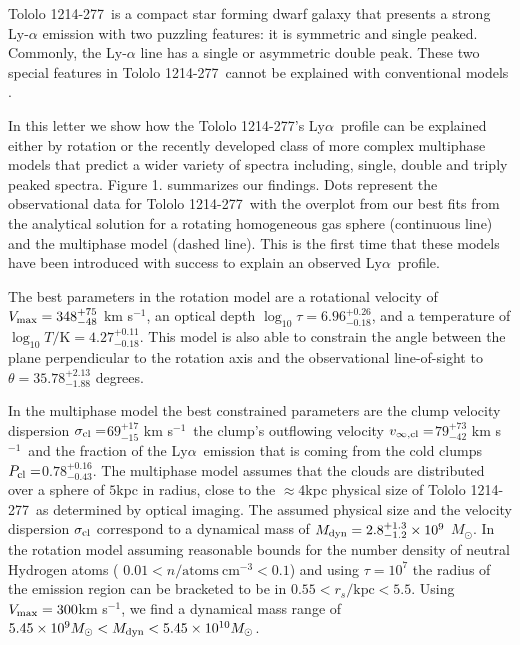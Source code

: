 \documentclass[a4paper, usenatbib, 12pt]{article}
\newcommand{\tol}{Tololo 1214-277}
\newcommand{\lya}{Ly$\alpha$}
\newcommand{\kms}{km s$^{-1}$}
\newcommand{\sigmaclump}{$69^{+17}_{-15}$ km s$^{-1}$}
\newcommand{\inftyclump}{$79^{+73}_{-42}$ km s$^{-1}$}
\newcommand{\probaclump}{$0.78^{+0.16}_{-0.43}$}
\begin{document}
{\tol\ is a compact star forming dwarf galaxy that presents a
strong Ly-$\alpha$ emission \cite{Thuan97} with two puzzling 
features: it is symmetric and single peaked.
Commonly, the Ly-$\alpha$ line has a single or asymmetric double peak. 
These two special features in \tol\ cannot be explained with
conventional models \cite{2006A&A...460..397V,2015ApJ...812..123G}.  

In this letter we show how the \tol's \lya\ profile can be explained
either by rotation or the recently developed class of more complex
multiphase models that predict a wider variety of spectra
including, single, double and triply peaked spectra.  
Figure 1. summarizes our findings.
Dots represent the observational data for \tol\ with the
overplot from our best fits from the analytical solution for a
rotating homogeneous gas sphere (continuous line) and the multiphase
model (dashed line). 
This is the first time that these models have been introduced with
success to explain an observed \lya\ profile.   


The best parameters in the rotation model are a rotational velocity of 
$V_{\rm max}=348^{+75}_{-48}$ \kms, an optical depth
$\log_{10}\tau=6.96^{+0.26}_{-0.18}$,  and a temperature of $\log_{10}
T/\mathrm {K} = 4.27^{+0.11}_{-0.18}$.  
This model is also able to constrain the angle between the plane
perpendicular to the rotation axis and the observational line-of-sight
to $\theta = 35.78^{+2.13}_{-1.88}$ degrees.

In the multiphase model the best constrained parameters are
the clump velocity dispersion  $\sigma_{\rm{cl}}=$\sigmaclump\,
the clump's outflowing velocity $v_{\infty, \rm{cl}}=$\inftyclump\
and the fraction of the \lya\ emission that is  coming
from the cold clumps  $P_{\rm cl}=$\probaclump.
The multiphase model assumes that the clouds are distributed over a
sphere of $5$kpc in radius, close to the $\approx 4$kpc physical size
of \tol\ as determined by optical imaging.
The assumed physical size and the velocity dispersion $\sigma_{\rm
  cl}$ correspond to a  dynamical mass of  $M_{\rm
  dyn}=2.8^{+1.3}_{-1.2}\times 10^{9}$ $M_{\odot}$. In the rotation
model assuming reasonable bounds for the number density of neutral Hydrogen atoms (
$0.01<n/\mathrm{atoms\ cm^{-3}}<0.1$) and using $\tau=10^7$ the radius
of the emission region can be bracketed to be in $0.55 <
r_s/\mathrm{kpc}< 5.5$.
Using $V_{\rm max}=300$km s$^{-1}$, we find a dynamical mass range of
$5.45\times 10^{9}M_{\odot} < M_{\rm dyn} < 5.45\times 10^{10} M_{\odot}$.  

}
\end{document}
